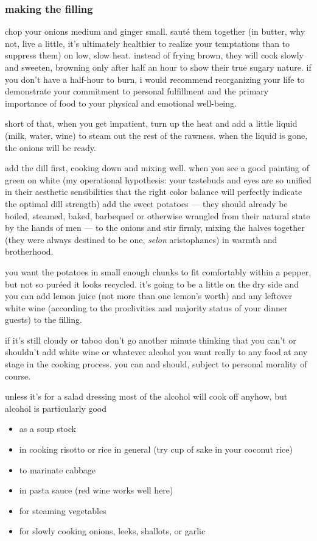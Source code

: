 \subsubsection{making the filling}

chop your onions medium and ginger small. saut\'{e} them together (in butter, 
why not, live a little, it's ultimately healthier to realize your temptations 
than to suppress them) on low, slow heat. instead of frying brown, they will 
cook slowly and sweeten, browning only after half an hour to show their true 
sugary nature. if you don't have a half-hour to burn, i would recommend 
reorganizing your life to demonstrate your commitment to personal fulfillment 
and the primary importance of food to your physical and emotional well-being.

short of that, when you get impatient, turn up the heat and add a little 
liquid (milk, water, wine) to steam out the rest of the rawness. when the 
liquid is gone, the onions will be ready.

add the dill first, cooking down and mixing well. when you see a good painting 
of green on white (my operational hypothesis: your tastebuds and eyes are so 
unified in their aesthetic sensibilities that the right color balance will 
perfectly indicate the optimal dill strength) add the sweet potatoes --- they 
should already be boiled, steamed, baked, barbequed or otherwise wrangled from 
their natural state by the hands of men --- to the onions and stir firmly, 
mixing the halves together (they were always destined to be one, 
\textit{selon} aristophanes) in warmth and brotherhood.

you want the potatoes in small enough chunks to fit comfortably within a 
pepper, but not so pur\'{e}ed it looks recycled. it's going to be a little on 
the dry side and you can add lemon juice (not more than one lemon's worth) and 
any leftover white wine (according to the proclivities and majority status of 
your dinner guests) to the filling.

if it's still cloudy or taboo don't go another minute thinking that you can't 
or shouldn't add white wine or whatever alcohol you want really to any food at 
any stage in the cooking process. you can and should, subject to personal 
morality of course.

unless it's for a salad dressing most of the alcohol will cook off anyhow, but 
alcohol is particularly good

\begin{itemize}
  \item as a soup stock 
  \item in cooking risotto or rice in general (try \onehalf cup of sake in your coconut rice)
  \item to marinate cabbage
  \item in pasta sauce (red wine works well here)
  \item for steaming vegetables
  \item for slowly cooking onions, leeks, shallots, or garlic
\end{itemize}

